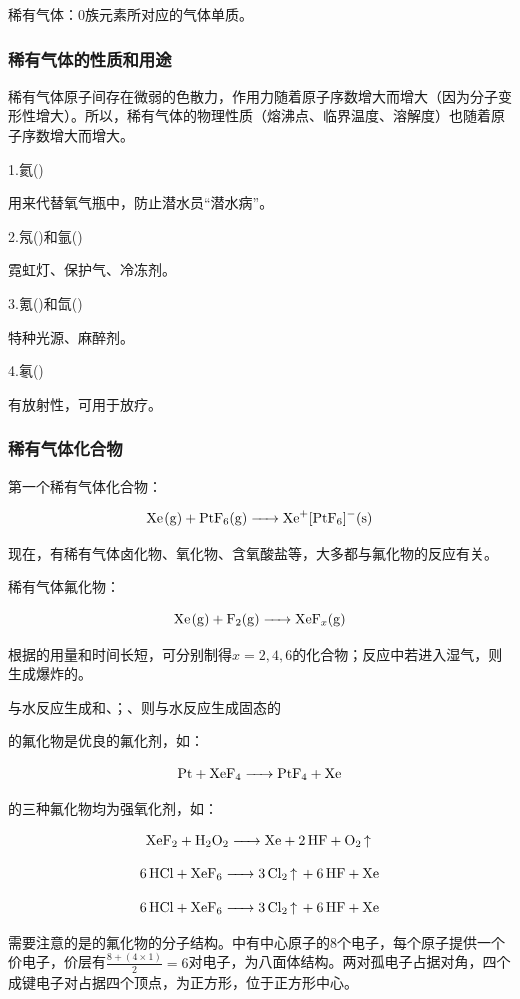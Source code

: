 \documentclass[a4paper,UTF8]{article}
\begin{document}
稀有气体：0族元素所对应的气体单质。

\subsubsection{稀有气体的性质和用途}

稀有气体原子间存在微弱的色散力，作用力随着原子序数增大而增大（因为分子变形性增大）。所以，稀有气体的物理性质（熔沸点、临界温度、溶解度）也随着原子序数增大而增大。

1.氦()

用来代替氧气瓶中，防止潜水员“潜水病”。

2.氖()和氩()

霓虹灯、保护气、冷冻剂。

3.氪()和氙()

特种光源、麻醉剂。

4.氡()

有放射性，可用于放疗。

\subsubsection{稀有气体化合物}
第一个稀有气体化合物：

$$ \ce{Xe(g) + PtF6(g) -> Xe+[PtF6]-(s)} $$

现在，有稀有气体卤化物、氧化物、含氧酸盐等，大多都与氟化物的反应有关。

稀有气体氟化物：

$$ \ce{Xe(g) + F2(g) -> XeF_{x}(g)} $$

根据的用量和时间长短，可分别制得$x=2,4,6$的化合物；反应中若进入湿气，则生成爆炸的。

与水反应生成和、；、则与水反应生成固态的

的氟化物是优良的氟化剂，如：

$$ \ce{Pt + XeF4 -> PtF4 + Xe} $$

的三种氟化物均为强氧化剂，如：

$$ \ce{XeF2 + H2O2 -> Xe + 2HF + O2 ^} $$

$$ \ce{6HCl + XeF6 -> 3Cl2 ^ + 6HF + Xe} $$

$$ \ce{6HCl + XeF6 -> 3Cl2 ^ + 6HF + Xe} $$

需要注意的是的氟化物的分子结构。中有中心原子的8个电子，每个原子提供一个价电子，价层有$\frac{8+(4\times1)}{2}=6$对电子，为八面体结构。两对孤电子占据对角，四个成键电子对占据四个顶点，为正方形，位于正方形中心。
\end{document}
